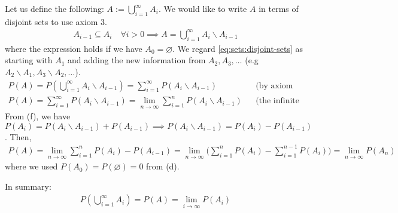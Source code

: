 \begin{enumerate}[label=\alph*.]
Let us define the following: $A := \bigcup_{i=1}^{\infty} A_{i}$. We would like to write $A$ in terms of disjoint sets to use axiom 3.
\begin{align}\label{eq:sets:disjoint-sets}
A_{i-1} \subseteq A_i \quad \forall i > 0 \implies A = \bigcup_{i=1}^{\infty} A_{i}\backslash A_{i-1}
\end{align}
where the expression holds if we have $A_{0} = \varnothing$. We regard \ref{eq:sets:disjoint-sets} as starting with $A_1$ and adding the new information from $A_2, A_3,\dots$ (e.g $A_2 \backslash A_1, A_3 \backslash A_2, \dots$). 
\begin{align}\label{eq:sets:axiom3-on-set}
P(A) = P\left(\bigcup_{i=1}^{\infty} A_{i}\backslash A_{i-1}\right) = \sum_{i=1}^\infty P(A_{i}\backslash A_{i-1})&&\text{(by axiom 3)}\\
P(A) = \sum_{i=1}^\infty P(A_{i}\backslash A_{i-1}) = \lim_{n\xrightarrow{}\infty} \sum_{i=1}^n P(A_{i}\backslash A_{i-1}) &&\text{(the infinite summation is a limit)}
\end{align}
From (f), we have $P(A_i) = P(A_{i}\backslash A_{i-1}) + P(A_{i-1}) \implies  P(A_{i}\backslash A_{i-1}) = P(A_i) - P(A_{i-1})$. Then,
\begin{align}
P(A) = \lim_{n\xrightarrow{}\infty} \sum_{i=1}^n P(A_i) - P(A_{i-1}) = \lim_{n\xrightarrow{}\infty} \bigg(\sum_{i=1}^n P(A_i) - \sum_{i=1}^{n-1} P(A_{i})\bigg) = \lim_{n\xrightarrow{}\infty} P(A_n)
\end{align}
where we used $P(A_0) = P(\varnothing) = 0$ from (d). 

In summary:
\begin{align}
P\left(\bigcup_{i=1}^{\infty} A_{i}\right) = P(A) = \lim_{i\xrightarrow{}\infty} P(A_i)
\end{align}

\end{enumerate}

